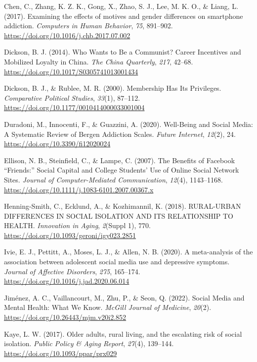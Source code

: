\documentclass[]{interact}
\theoremstyle{plain}%
\theoremstyle{definition}
\theoremstyle{remark}
\newlength{\cslhangindent}
\newenvironment{CSLReferences}[2] %
 {\begin{list}{}{%
  \setlength{\itemindent}{0pt}
  \setlength{\leftmargin}{0pt}
  \setlength{\parsep}{0pt}
  \ifodd #1
   \setlength{\leftmargin}{\cslhangindent}
   \setlength{\itemindent}{-1\cslhangindent}
  \fi
  \setlength{\itemsep}{#2\baselineskip}}}
 {\end{list}}
\begin{document}
\begin{CSLReferences}{1}{0}
Chen, C., Zhang, K. Z. K., Gong, X., Zhao, S. J., Lee, M. K. O., \&
Liang, L. (2017). Examining the effects of motives and gender
differences on smartphone addiction. \emph{Computers in Human Behavior},
\emph{75}, 891--902. \url{https://doi.org/10.1016/j.chb.2017.07.002}

Dickson, B. J. (2014). Who Wants to Be a Communist? Career Incentives
and Mobilized Loyalty in China. \emph{The China Quarterly}, \emph{217},
42--68. \url{https://doi.org/10.1017/S0305741013001434}

Dickson, B. J., \& Rublee, M. R. (2000). Membership Has Its Privileges.
\emph{Comparative Political Studies}, \emph{33}(1), 87--112.
\url{https://doi.org/10.1177/0010414000033001004}

Duradoni, M., Innocenti, F., \& Guazzini, A. (2020). Well-Being and
Social Media: A Systematic Review of Bergen Addiction Scales.
\emph{Future Internet}, \emph{12}(2), 24.
\url{https://doi.org/10.3390/fi12020024}

Ellison, N. B., Steinfield, C., \& Lampe, C. (2007). The Benefits of
Facebook {``}Friends:{''} Social Capital and College Students{'} Use of
Online Social Network Sites. \emph{Journal of Computer-Mediated
Communication}, \emph{12}(4), 1143--1168.
\url{https://doi.org/10.1111/j.1083-6101.2007.00367.x}

Henning-Smith, C., Ecklund, A., \& Kozhimannil, K. (2018). RURAL-URBAN
DIFFERENCES IN SOCIAL ISOLATION AND ITS RELATIONSHIP TO HEALTH.
\emph{Innovation in Aging}, \emph{2}(Suppl 1), 770.
\url{https://doi.org/10.1093/geroni/igy023.2851}

Ivie, E. J., Pettitt, A., Moses, L. J., \& Allen, N. B. (2020). A
meta-analysis of the association between adolescent social media use and
depressive symptoms. \emph{Journal of Affective Disorders}, \emph{275},
165--174. \url{https://doi.org/10.1016/j.jad.2020.06.014}

Jiménez, A. C., Vaillancourt, M., Zhu, P., \& Seon, Q. (2022). Social
Media and Mental Health: What We Know. \emph{McGill Journal of
Medicine}, \emph{20}(2). \url{https://doi.org/10.26443/mjm.v20i2.852}

Kaye, L. W. (2017). Older adults, rural living, and the escalating risk
of social isolation. \emph{Public Policy \& Aging Report}, \emph{27}(4),
139--144. \url{https://doi.org/10.1093/ppar/prx029}


\end{CSLReferences}
\end{document}
